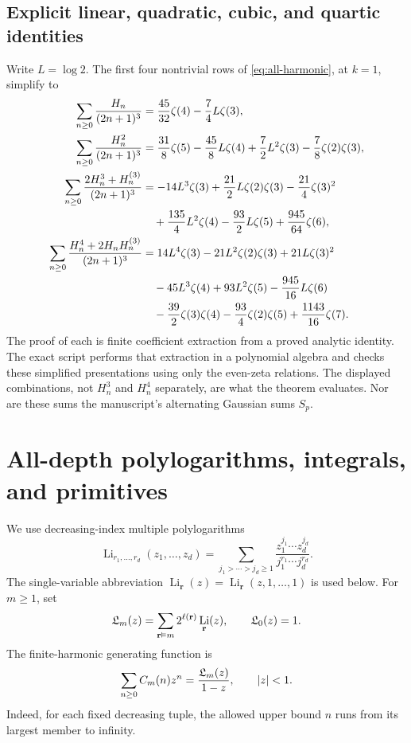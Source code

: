 \documentclass[11pt,a4paper]{article}
\numberwithin{equation}{section}
\theoremstyle{definition}\newtheorem{definition}[theorem]{Definition}
\theoremstyle{remark}\newtheorem{remark}[theorem]{Remark}
\DeclareMathOperator{\Li}{Li}
\begin{document}
\subsection{Explicit linear, quadratic, cubic, and quartic identities}
Write $L=\log2$. The first four nontrivial rows of
\eqref{eq:all-harmonic}, at $k=1$, simplify to
\begin{align}
 \sum_{n\ge0}\frac{H_n}{(2n+1)^3}
 &=\frac{45}{32}\zeta(4)-\frac74L\zeta(3),\label{eq:example1}\\
 \sum_{n\ge0}\frac{H_n^2}{(2n+1)^3}
 &=\frac{31}{8}\zeta(5)-\frac{45}{8}L\zeta(4)
   +\frac72L^2\zeta(3)-\frac78\zeta(2)\zeta(3),\label{eq:example2}\\
 \sum_{n\ge0}\frac{2H_n^3+H_n^{(3)}}{(2n+1)^3}
 &=-14L^3\zeta(3)+\frac{21}{2}L\zeta(2)\zeta(3)
      -\frac{21}{4}\zeta(3)^2\notag\\
 &\quad+\frac{135}{4}L^2\zeta(4)-\frac{93}{2}L\zeta(5)
      +\frac{945}{64}\zeta(6),\label{eq:example3}\\
 \sum_{n\ge0}\frac{H_n^4+2H_nH_n^{(3)}}{(2n+1)^3}
 &=14L^4\zeta(3)-21L^2\zeta(2)\zeta(3)+21L\zeta(3)^2\notag\\
 &\quad-45L^3\zeta(4)+93L^2\zeta(5)-\frac{945}{16}L\zeta(6)\notag\\
 &\quad-\frac{39}{2}\zeta(3)\zeta(4)-\frac{93}{4}\zeta(2)\zeta(5)
      +\frac{1143}{16}\zeta(7).\label{eq:example4}
\end{align}
The proof of each is finite coefficient extraction from a proved
analytic identity. The exact script performs that extraction in a
polynomial algebra and checks these simplified presentations using only
the even-zeta relations. The displayed combinations, not $H_n^3$ and
$H_n^4$ separately, are what the theorem evaluates. Nor are these sums
the manuscript's alternating Gaussian sums $S_p$.

\section{All-depth polylogarithms, integrals, and primitives}
\label{sec:polylog}
We use decreasing-index multiple polylogarithms
\begin{equation}
 \Li_{r_1,\ldots,r_d}(z_1,\ldots,z_d)
 =\sum_{j_1>\cdots>j_d\ge1}
 \frac{z_1^{j_1}\cdots z_d^{j_d}}{j_1^{r_1}\cdots j_d^{r_d}}.
 \label{eq:MPL}
\end{equation}
The single-variable abbreviation
$\Li_{\mathbf r}(z)=\Li_{\mathbf r}(z,1,\ldots,1)$ is used below.
For $m\ge1$, set
\begin{equation}
 \Lcal_m(z)=\sum_{\mathbf r\vDash m}2^{\ell(\mathbf r)}\Li_{\mathbf r}(z),
 \qquad \Lcal_0(z)=1.
 \label{eq:Lm}
\end{equation}
The finite-harmonic generating function is
\begin{equation}
 \sum_{n\ge0}C_m(n)z^n=\frac{\mathfrak L_m(z)}{1-z},\qquad |z|<1.
 \label{eq:H-generating}
\end{equation}
Indeed, for each fixed decreasing tuple, the allowed upper bound $n$
runs from its largest member to infinity.
\end{document}

